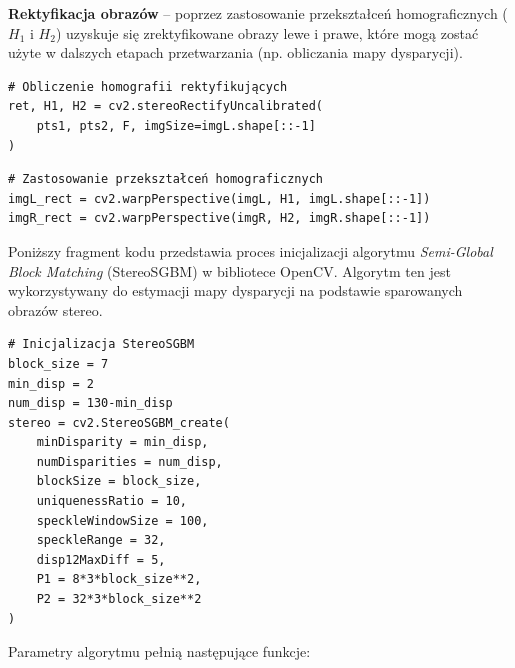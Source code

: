 \documentclass[magisterska]{pracadypl}
\begin{document}
\textbf{Rektyfikacja obrazów} – poprzez zastosowanie przekształceń homograficznych ($H_1$ i $H_2$) uzyskuje się zrektyfikowane obrazy lewe i prawe, które mogą zostać użyte w dalszych etapach przetwarzania (np. obliczania mapy dysparycji).

\begin{lstlisting}[style=mypython]
# Obliczenie homografii rektyfikujących
ret, H1, H2 = cv2.stereoRectifyUncalibrated(
    pts1, pts2, F, imgSize=imgL.shape[::-1]
)
\end{lstlisting}

\begin{lstlisting}[style=mypython]
# Zastosowanie przekształceń homograficznych
imgL_rect = cv2.warpPerspective(imgL, H1, imgL.shape[::-1])
imgR_rect = cv2.warpPerspective(imgR, H2, imgR.shape[::-1])
\end{lstlisting}

Poniższy fragment kodu przedstawia proces inicjalizacji algorytmu \textit{Semi-Global Block Matching} (StereoSGBM) w bibliotece OpenCV.  
Algorytm ten jest wykorzystywany do estymacji mapy dysparycji na podstawie sparowanych obrazów stereo.  

\begin{lstlisting}[style=mypython]
# Inicjalizacja StereoSGBM
block_size = 7
min_disp = 2
num_disp = 130-min_disp
stereo = cv2.StereoSGBM_create(
    minDisparity = min_disp,
    numDisparities = num_disp,
    blockSize = block_size,
    uniquenessRatio = 10,
    speckleWindowSize = 100,
    speckleRange = 32,
    disp12MaxDiff = 5,
    P1 = 8*3*block_size**2,
    P2 = 32*3*block_size**2
)
\end{lstlisting}

Parametry algorytmu pełnią następujące funkcje:
\end{document}
